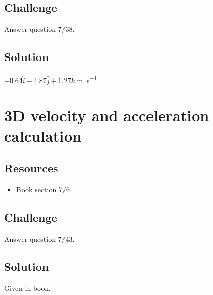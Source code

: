 \subsection*{Challenge}
Answer question 7/38.

\subsection*{Solution}
$-0.64 \hat{i} - 4.87 \hat{j} + 1.27 \hat{k}$ \si{\meter\per\second}




\newpage
\section{3D velocity and acceleration calculation}

\subsection*{Resources}
\begin{itemize}
    \item Book section 7/6
\end{itemize}

\subsection*{Challenge}
Answer question 7/43.

\subsection*{Solution}
Given in book.
